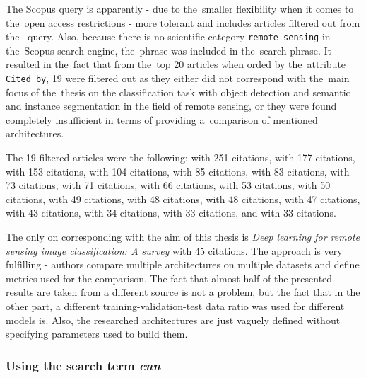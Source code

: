 The Scopus query is apparently - due to the~smaller flexibility when it comes to the~open access restrictions - more tolerant and includes articles filtered out from the~ query. Also, because there is no scientific category \verb|remote sensing| in the~Scopus search engine, the~phrase was included in the~search phrase. It resulted in the~fact that from the~top 20 articles when orded by the~attribute \verb|Cited by|, 19 were filtered out as they either did not correspond with the~main focus of the~thesis on the classification task with object detection and semantic and instance segmentation in the field of remote sensing, or they were found completely insufficient in terms of providing a~comparison of mentioned architectures.

The 19 filtered articles were the following: \cite{dl-for-cv} with 251 citations, \cite{review-ml-in-rs} with 177 citations, \cite{review-ml-agriculture} with 153 citations, \cite{review-uav-applications} with 104 citations, \cite{state-of-the-art-ann} with 85 citations, \cite{lc-2-0} with 83 citations, \cite{state-of-the-art-dl} with 73 citations, \cite{review-water-dl} with 71 citations, \cite{review-plant-stress} with 66 citations, \cite{review-text-class} with 53 citations, \cite{cv-animal-ecology} with 50 citations, \cite{review-cv-infra-inspections} with 49 citations, \cite{review-ann-plant-disease} with 48 citations, \cite{review-st-fusion-multisource} with 48 citations, \cite{review-ml-energy} with 47 citations, \cite{review-bd-disaster} with 43 citations, \cite{review-uav-rs} with 34 citations, \cite{nanophotonics} with 33 citations, and \cite{review-point-clouds} with 33 citations.

The only on corresponding with the aim of this thesis is \textit{Deep learning for remote sensing image classification: A survey} \cite{review-dl-rs} with 45 citations. The approach is very fulfilling - authors compare multiple architectures on multiple datasets and define metrics used for the comparison. The fact that almost half of the presented results are taken from a different source is not a problem, but the fact that in the other part, a different training-validation-test data ratio was used for different models is. Also, the researched architectures are just vaguely defined without specifying parameters used to build them.

\subsubsection{Using the search term \textit{cnn}}
\label{scopus-reviews-cnn}

